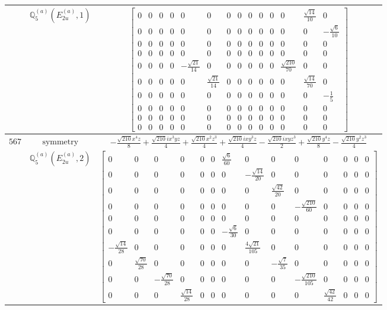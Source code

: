 \documentclass[fleqn,8pt,landscape]{jsarticle}
\begin{document}
\begin{longtable}{ccc}
$  $ & $ \mathbb{Q}_{5}^{(a)}(E_{2u}^{(a)},1) $ & $ \begin{bmatrix} 0 & 0 & 0 & 0 & 0 & 0 & 0 & 0 & 0 & 0 & 0 & 0 & \frac{\sqrt{14}}{10} & 0 \\ 0 & 0 & 0 & 0 & 0 & 0 & 0 & 0 & 0 & 0 & 0 & 0 & 0 & - \frac{\sqrt{6}}{10} \\ 0 & 0 & 0 & 0 & 0 & 0 & 0 & 0 & 0 & 0 & 0 & 0 & 0 & 0 \\ 0 & 0 & 0 & 0 & 0 & 0 & 0 & 0 & 0 & 0 & 0 & 0 & 0 & 0 \\ 0 & 0 & 0 & 0 & - \frac{\sqrt{21}}{14} & 0 & 0 & 0 & 0 & 0 & 0 & \frac{\sqrt{210}}{70} & 0 & 0 \\ 0 & 0 & 0 & 0 & 0 & \frac{\sqrt{21}}{14} & 0 & 0 & 0 & 0 & 0 & 0 & \frac{\sqrt{14}}{70} & 0 \\ 0 & 0 & 0 & 0 & 0 & 0 & 0 & 0 & 0 & 0 & 0 & 0 & 0 & - \frac{1}{5} \\ 0 & 0 & 0 & 0 & 0 & 0 & 0 & 0 & 0 & 0 & 0 & 0 & 0 & 0 \\ 0 & 0 & 0 & 0 & 0 & 0 & 0 & 0 & 0 & 0 & 0 & 0 & 0 & 0 \\ 0 & 0 & 0 & 0 & 0 & 0 & 0 & 0 & 0 & 0 & 0 & 0 & 0 & 0 \end{bmatrix} $ \\ \hline
$ 567 $ & $ \text{symmetry} $ & $ - \frac{\sqrt{210} x^{4} z}{8} + \frac{\sqrt{210} i x^{3} y z}{4} + \frac{\sqrt{210} x^{2} z^{3}}{4} + \frac{\sqrt{210} i x y^{3} z}{4} - \frac{\sqrt{210} i x y z^{3}}{2} + \frac{\sqrt{210} y^{4} z}{8} - \frac{\sqrt{210} y^{2} z^{3}}{4} $ \\
$  $ & $ \mathbb{Q}_{5}^{(a)}(E_{2u}^{(a)},2) $ & $ \begin{bmatrix} 0 & 0 & 0 & 0 & 0 & 0 & \frac{\sqrt{6}}{60} & 0 & 0 & 0 & 0 & 0 & 0 & 0 \\ 0 & 0 & 0 & 0 & 0 & 0 & 0 & - \frac{\sqrt{14}}{20} & 0 & 0 & 0 & 0 & 0 & 0 \\ 0 & 0 & 0 & 0 & 0 & 0 & 0 & 0 & \frac{\sqrt{42}}{20} & 0 & 0 & 0 & 0 & 0 \\ 0 & 0 & 0 & 0 & 0 & 0 & 0 & 0 & 0 & - \frac{\sqrt{210}}{60} & 0 & 0 & 0 & 0 \\ 0 & 0 & 0 & 0 & 0 & 0 & 0 & 0 & 0 & 0 & 0 & 0 & 0 & 0 \\ 0 & 0 & 0 & 0 & 0 & 0 & - \frac{\sqrt{6}}{30} & 0 & 0 & 0 & 0 & 0 & 0 & 0 \\ - \frac{\sqrt{14}}{28} & 0 & 0 & 0 & 0 & 0 & 0 & \frac{4 \sqrt{21}}{105} & 0 & 0 & 0 & 0 & 0 & 0 \\ 0 & \frac{\sqrt{70}}{28} & 0 & 0 & 0 & 0 & 0 & 0 & - \frac{\sqrt{7}}{35} & 0 & 0 & 0 & 0 & 0 \\ 0 & 0 & - \frac{\sqrt{70}}{28} & 0 & 0 & 0 & 0 & 0 & 0 & - \frac{\sqrt{210}}{105} & 0 & 0 & 0 & 0 \\ 0 & 0 & 0 & \frac{\sqrt{14}}{28} & 0 & 0 & 0 & 0 & 0 & 0 & \frac{\sqrt{42}}{42} & 0 & 0 & 0 \end{bmatrix} $ \\ \hline

\end{longtable}
\end{document}
